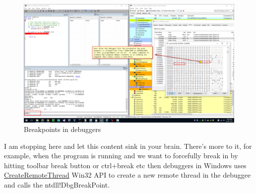 \documentclass{article}
\begin{document}
\begin{figure}[H]
\centering
\includegraphics[width=\textwidth]{5.Breakpoints-in-Debuggers.png}
\caption{Breakpoints in debuggers}
\end{figure}

I am stopping here and let this content sink in your brain. There’s more to it, for example, when the program is running and we want to forcefully break in by hitting toolbar break button or ctrl+break etc then debuggers in Windows uses \href{https://msdn.microsoft.com/en-us/library/windows/desktop/ms682437(v=vs.85).aspx}{CreateRemoteThread} Win32 API to create a new remote thread in the debuggee and calls the ntdll!DbgBreakPoint.
\end{document}
